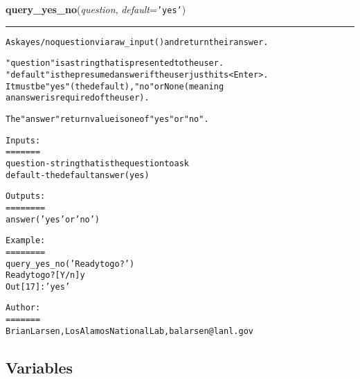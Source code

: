 \hspace{.8\funcindent}\begin{boxedminipage}{\funcwidth}

    \raggedright \textbf{query\_yes\_no}(\textit{question}, \textit{default}={\tt \texttt{'}\texttt{yes}\texttt{'}})

    \vspace{-1.5ex}

    \rule{\textwidth}{0.5\fboxrule}
\setlength{\parskip}{2ex}
\begin{alltt}
Ask a yes/no question via raw\_input() and return their answer.

"question" is a string that is presented to the user.
"default" is the presumed answer if the user just hits {\textless}Enter{\textgreater}.
    It must be "yes" (the default), "no" or None (meaning
    an answer is required of the user).

The "answer" return value is one of "yes" or "no".

Inputs:
=======
question - string that is the question to ask
default - the default answer (yes)

Outputs:
========
answer ('yes' or 'no')

Example:
======== 
query\_yes\_no('Ready to go?')
Ready to go? [Y/n] y
Out[17]: 'yes'


Author:
=======
Brian Larsen, Los Alamos National Lab, balarsen@lanl.gov
\end{alltt}

\setlength{\parskip}{1ex}
    \end{boxedminipage}



  \subsection{Variables}

